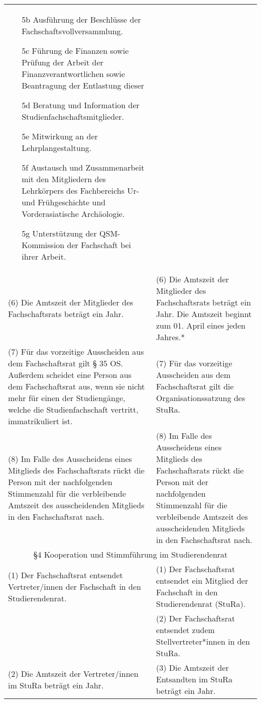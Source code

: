 {\begin{longtable}{|p{7.5cm}|p{7.5cm}|}
\begin{itemize}
        \item[5b]Ausführung der Beschlüsse der Fachschaftsvollversammlung.
        \item[5c]Führung de Finanzen sowie Prüfung der Arbeit der Finanzverantwortlichen sowie
        Beantragung der Entlastung dieser
        \item[5d]Beratung und Information der Studienfachschaftsmitglieder.
        \item[5e]Mitwirkung an der Lehrplangestaltung.
        \item[5f]Austausch und Zusammenarbeit mit den Mitgliedern des Lehrkörpers des Fachbereichs Ur- und Frühgeschichte und Vorderasiatische Archäologie.    
        \item[5g]Unterstützung der QSM-Kommission der Fachschaft bei ihrer Arbeit. 
        \end{itemize}\\
        (6)  Die Amtszeit der Mitglieder des Fachschaftsrats beträgt ein Jahr.&(6)  Die Amtszeit der Mitglieder des Fachschaftsrats beträgt ein Jahr. Die Amtszeit
        beginnt zum 01. April eines jeden Jahres.*\\
        (7)  Für das vorzeitige Ausscheiden aus dem Fachschaftsrat gilt § 35 OS. Außerdem
        scheidet eine Person aus dem Fachschaftsrat aus, wenn sie nicht mehr für einen der
        Studiengänge, welche die Studienfachschaft vertritt, immatrikuliert ist.&(7)  Für das vorzeitige Ausscheiden aus dem Fachschaftsrat gilt die
        Organisationssatzung des StuRa.\\
        (8) Im Falle des Ausscheidens eines Mitglieds des Fachschaftsrats rückt die Person
        mit der nachfolgenden Stimmenzahl für die verbleibende Amtszeit des ausscheidenden
        Mitglieds in den Fachschaftsrat nach.&(8) Im Falle des Ausscheidens eines Mitglieds des Fachschaftsrats rückt die Person
        mit der nachfolgenden Stimmenzahl für die verbleibende Amtszeit des ausscheidenden
        Mitglieds in den Fachschaftsrat nach.\\
        \multicolumn{2}{|c|}{§4 Kooperation und Stimmführung im Studierendenrat}\\\hline
        (1)  Der Fachschaftsrat entsendet Vertreter/innen der Fachschaft in den
        Studierendenrat.&(1)  Der Fachschaftsrat entsendet ein Mitglied der Fachschaft in den Studierendenrat
        (StuRa).\\
        &(2) Der Fachschaftsrat entsendet zudem Stellvertreter*innen in den StuRa. \\
        (2)  Die Amtszeit der Vertreter/innen im StuRa beträgt ein Jahr.& (3)  Die Amtszeit der Entsandten im StuRa beträgt ein Jahr.\\

\end{longtable}}
